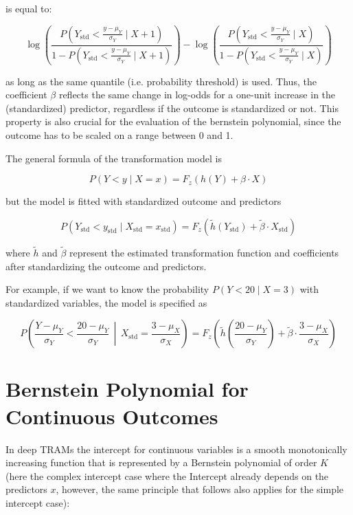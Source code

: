is equal to:

\[
\log \left( \frac{P\left(Y_{\text{std}} < \frac{y - \mu_Y}{\sigma_Y} \mid X + 1\right)}{1 - P\left(Y_{\text{std}} < \frac{y - \mu_Y}{\sigma_Y} \mid X + 1\right)} \right) -
\log \left( \frac{P\left(Y_{\text{std}} < \frac{y - \mu_Y}{\sigma_Y} \mid X\right)}{1 - P\left(Y_{\text{std}} < \frac{y - \mu_Y}{\sigma_Y} \mid X\right)} \right)
\]

as long as the same quantile (i.e. probability threshold) is used. Thus, the coefficient \( \beta \) reflects the same change in log-odds for a one-unit increase in the (standardized) predictor, regardless if the outcome is standardized or not. This property is also crucial for the evaluation of the bernstein polynomial, since the outcome has to be scaled on a range between 0 and 1.


The general formula of the transformation model is

\[
P(Y < y \mid X = x) = F_z\left(h(Y) + \beta \cdot X\right)
\]

but the model is fitted with standardized outcome and predictors

\[
P(Y_{\text{std}} < y_{\text{std}} \mid X_{\text{std}} = x_{\text{std}}) = F_z\left(\tilde{h}(Y_{\text{std}}) + \tilde{\beta} \cdot X_{\text{std}}\right)
\]

where $\tilde{h}$ and $\tilde{\beta}$ represent the estimated transformation function and coefficients after standardizing the outcome and predictors.

For example, if we want to know the probability \( P(Y < 20 \mid X = 3) \) with standardized variables, the model is specified as

\[
P\left(\frac{Y - \mu_Y}{\sigma_Y} < \frac{20 - \mu_Y}{\sigma_Y} \,\middle|\, X_{\text{std}} = \frac{3 - \mu_X}{\sigma_X} \right)
= F_z\left(\tilde{h}\left(\frac{20 - \mu_Y}{\sigma_Y}\right) + \tilde{\beta} \cdot \frac{3 - \mu_X}{\sigma_X} \right)
\]


\section{Bernstein Polynomial for Continuous Outcomes}

In deep TRAMs the intercept for continuous variables is a smooth monotonically increasing function that is represented by a Bernstein polynomial of order \( K \) (here the complex intercept case where the Intercept already depends on the predictors $x$, however, the same principle that follows also applies for the simple intercept case):

